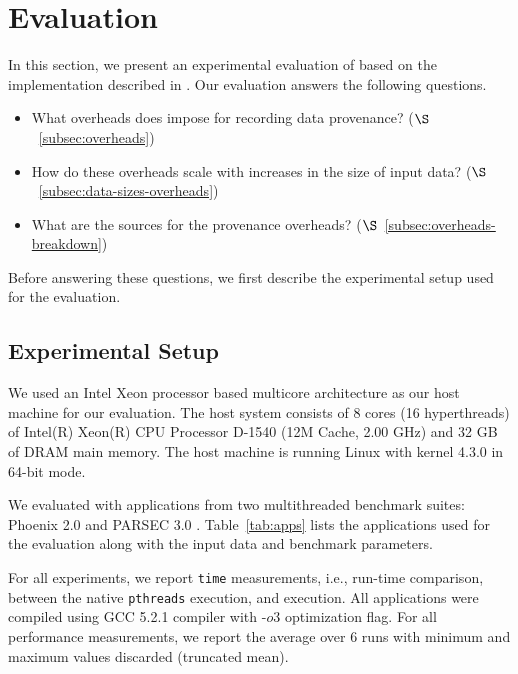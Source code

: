 \section{Evaluation}
\label{sec:evaluation}

In this section, we present an experimental evaluation of \projecttitle based on the implementation described in  . Our evaluation answers the following questions.

\begin{itemize}
\item What overheads does \projecttitle impose for recording data provenance? ($\S$~\ref{subsec:overheads})
\item How do these overheads scale with increases in the size of input data? ($\S$~\ref{subsec:data-sizes-overheads})
\item What are the sources for the provenance overheads? ($\S$~\ref{subsec:overheads-breakdown})
\end{itemize}

Before answering these questions, we first describe the experimental setup used for the evaluation.

\subsection{Experimental Setup}


 We used an Intel Xeon processor based
multicore architecture as our host machine for our evaluation. The
host system consists of 8 cores (16 hyperthreads) of Intel(R) Xeon(R) CPU Processor D-1540
(12M Cache, 2.00 GHz) and 32 GB of DRAM main memory. The host
machine is running Linux with kernel 4.3.0 in 64-bit mode.


  We evaluated \projecttitle with applications from two multithreaded benchmark suites: Phoenix 2.0 \cite{phoenix} and PARSEC 3.0 \cite{parsec}. Table~\ref{tab:apps} lists the applications used for the evaluation along with the input data and benchmark parameters.


  For all experiments,  we report {\tt time}
measurements, i.e., run-time comparison, between the native {\tt pthreads}
execution, and \projecttitle execution.  All applications were compiled using
GCC 5.2.1 compiler with -$o3$ optimization flag. For all performance
measurements, we report the average over 6 runs with minimum and maximum values
discarded (truncated mean).

